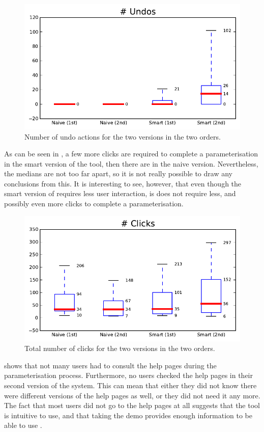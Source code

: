 \begin{figure}[h!]
\center
\includegraphics[width=.6\textwidth]{img/graphs/1a_10.pdf}
\caption{Number of undo actions for the two versions in the two orders.}
\end{figure}

As can be seen in , a few more clicks are required to complete a parameterisation in the smart version of the tool, then there are in the naive version. Nevertheless, the medians are not too far apart, so it is not really possible to draw any conclusions from this. It is interesting to see, however, that even though the smart version of \oframp{} requires less user interaction, is does not require less, and possibly even more clicks to complete a parameterisation.

\begin{figure}[h!]
\center
\includegraphics[width=.6\textwidth]{img/graphs/1a_04.pdf}
\caption{Total number of clicks for the two versions in the two orders.}
\end{figure}

 shows that not many users had to consult the help pages during the parameterisation process. Furthermore, no users checked the help pages in their second version of the system. This can mean that either they did not know there were different versions of the help pages as well, or they did not need it any more. The fact that most users did not go to the help pages at all suggests that the tool is intuitive to use, and that taking the demo provides enough information to be able to use \oframp.


